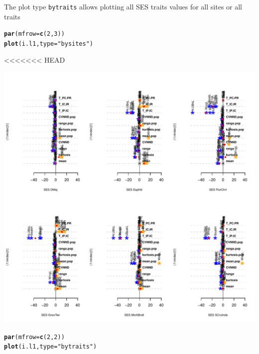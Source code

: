 \documentclass[12pt]{article}\usepackage[]{graphicx}\usepackage[]{color}
\makeatletter
\def\maxwidth{ %
  \ifdim\Gin@nat@width>\linewidth
    \linewidth
  \else
    \Gin@nat@width
  \fi
}
\newcommand{\hlnum}[1]{\textcolor[rgb]{0.686,0.059,0.569}{#1}}%
\newcommand{\hlstr}[1]{\textcolor[rgb]{0.192,0.494,0.8}{#1}}%
\newcommand{\hlstd}[1]{\textcolor[rgb]{0.345,0.345,0.345}{#1}}%
\newcommand{\hlkwc}[1]{\textcolor[rgb]{0.333,0.667,0.333}{#1}}%
\newcommand{\hlkwd}[1]{\textcolor[rgb]{0.737,0.353,0.396}{\textbf{#1}}}%
\newenvironment{kframe}{%
 \def\at@end@of@kframe{}%
 \ifinner\ifhmode%
  \def\at@end@of@kframe{\end{minipage}}%
  \begin{minipage}{\columnwidth}%
 \fi\fi%
 \def\FrameCommand##1{\hskip\@totalleftmargin \hskip-\fboxsep
 \colorbox{shadecolor}{##1}\hskip-\fboxsep
     \hskip-\linewidth \hskip-\@totalleftmargin \hskip\columnwidth}%
 \MakeFramed {\advance\hsize-\width
   \@totalleftmargin\z@ \linewidth\hsize
   \@setminipage}}%
 {\par\unskip\endMakeFramed%
 \at@end@of@kframe}
\newenvironment{knitrout}{}{} %
\makeatother
\begin{document}
The plot type \texttt{bytraits} allows plotting all SES traits values for all sites or all traits
\begin{knitrout}
\color{fgcolor}\begin{kframe}
\begin{alltt}
\hlkwd{par}\hlstd{(}\hlkwc{mfrow} \hlstd{=} \hlkwd{c}\hlstd{(}\hlnum{2}\hlstd{,}\hlnum{3}\hlstd{))}
\hlkwd{plot}\hlstd{(i.l1,}\hlkwc{type} \hlstd{=} \hlstr{"bysites"}\hlstd{)}
\end{alltt}
<<<<<<< HEAD
\end{kframe}
\includegraphics[width=\maxwidth]{figure/unnamed-chunk-501} 
\begin{kframe}\begin{alltt}
\hlkwd{par}\hlstd{(}\hlkwc{mfrow} \hlstd{=} \hlkwd{c}\hlstd{(}\hlnum{2}\hlstd{,}\hlnum{2}\hlstd{))}
\hlkwd{plot}\hlstd{(i.l1,}\hlkwc{type} \hlstd{=} \hlstr{"bytraits"}\hlstd{)}
\end{alltt}
\end{kframe}

\end{knitrout}
\end{document}
